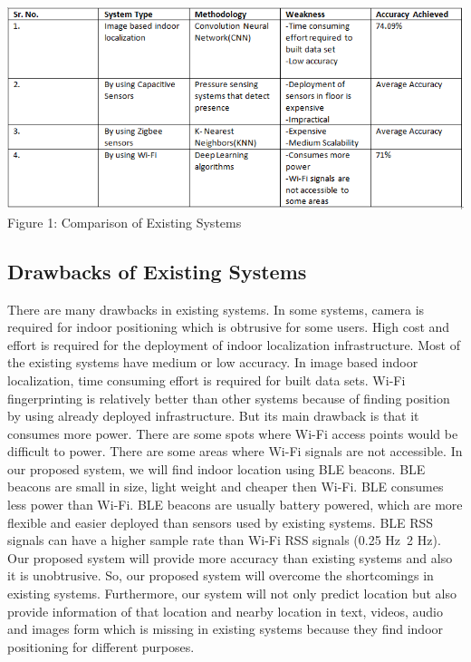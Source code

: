 \documentclass{article}
\begin{document}
\begin{center}
\includegraphics[scale=0.8]{abc}
\\Figure 1: Comparison of Existing Systems
\label{fig:five}
\end{center}





\subsection{Drawbacks of Existing Systems}
There are many drawbacks in existing systems. In some systems, camera is required for indoor positioning which is obtrusive for some users. High cost and effort is required for the deployment of indoor localization infrastructure. Most of the existing systems have medium or low accuracy. In image based indoor localization, time consuming effort is required for built data sets. Wi-Fi fingerprinting is relatively better than other systems because of finding position by using already deployed infrastructure. But its main drawback is that it consumes more power. There are some spots where Wi-Fi access points would be difficult to power. There are some areas where Wi-Fi signals are not accessible. In our proposed system, we will find indoor location using BLE beacons. BLE beacons are small in size, light weight and cheaper then Wi-Fi. BLE consumes less power than Wi-Fi. BLE beacons are usually battery powered, which are more flexible and easier deployed than sensors used by existing systems. BLE RSS signals can have a higher sample rate than Wi-Fi RSS signals (0.25 Hz~2 Hz). Our proposed system will provide more accuracy than existing systems and also it is unobtrusive. So, our proposed system will overcome the shortcomings in existing systems. Furthermore, our system will not only predict location but also provide information of that location and nearby location in text, videos, audio and images form which is missing in existing systems because they find indoor positioning for different purposes.\cite{research4}\\
\end{document}
